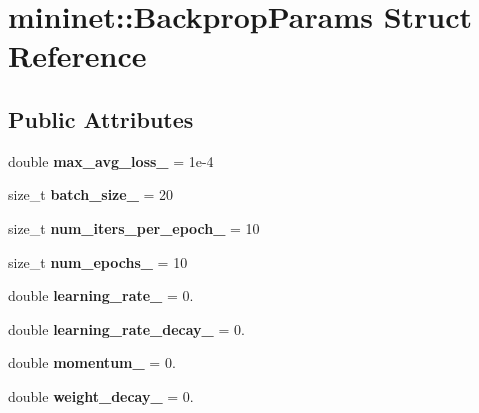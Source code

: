 \hypertarget{structmininet_1_1_backprop_params}{}\section{mininet\+:\+:Backprop\+Params Struct Reference}
\label{structmininet_1_1_backprop_params}
\subsection*{Public Attributes}
\begin{DoxyCompactItemize}
\item 
\hypertarget{structmininet_1_1_backprop_params_af4eee86c87c22531f2341de24ba90c86}{}\label{structmininet_1_1_backprop_params_af4eee86c87c22531f2341de24ba90c86} 
double {\bfseries max\+\_\+avg\+\_\+loss\+\_\+} = 1e-\/4
\item 
\hypertarget{structmininet_1_1_backprop_params_a89f75ef7b703abf69fde84f2df4e8648}{}\label{structmininet_1_1_backprop_params_a89f75ef7b703abf69fde84f2df4e8648} 
size\+\_\+t {\bfseries batch\+\_\+size\+\_\+} = 20
\item 
\hypertarget{structmininet_1_1_backprop_params_aa714c38be8deba2586ebb486a6f759dd}{}\label{structmininet_1_1_backprop_params_aa714c38be8deba2586ebb486a6f759dd} 
size\+\_\+t {\bfseries num\+\_\+iters\+\_\+per\+\_\+epoch\+\_\+} = 10
\item 
\hypertarget{structmininet_1_1_backprop_params_adf7d38efd1f9d8b12f69300c94b11bd6}{}\label{structmininet_1_1_backprop_params_adf7d38efd1f9d8b12f69300c94b11bd6} 
size\+\_\+t {\bfseries num\+\_\+epochs\+\_\+} = 10
\item 
\hypertarget{structmininet_1_1_backprop_params_ae7774867f9587f2f07a6fc8dc073585d}{}\label{structmininet_1_1_backprop_params_ae7774867f9587f2f07a6fc8dc073585d} 
double {\bfseries learning\+\_\+rate\+\_\+} = 0.
\item 
\hypertarget{structmininet_1_1_backprop_params_abf7115d0cc8e9ae54d1aec6b2fc4ae21}{}\label{structmininet_1_1_backprop_params_abf7115d0cc8e9ae54d1aec6b2fc4ae21} 
double {\bfseries learning\+\_\+rate\+\_\+decay\+\_\+} = 0.
\item 
\hypertarget{structmininet_1_1_backprop_params_a75dac35c45c55d6b5d8c18cee553c84b}{}\label{structmininet_1_1_backprop_params_a75dac35c45c55d6b5d8c18cee553c84b} 
double {\bfseries momentum\+\_\+} = 0.
\item 
\hypertarget{structmininet_1_1_backprop_params_ae1f8124837580fe3b020213ed4f56772}{}\label{structmininet_1_1_backprop_params_ae1f8124837580fe3b020213ed4f56772} 
double {\bfseries weight\+\_\+decay\+\_\+} = 0.
\end{DoxyCompactItemize}



